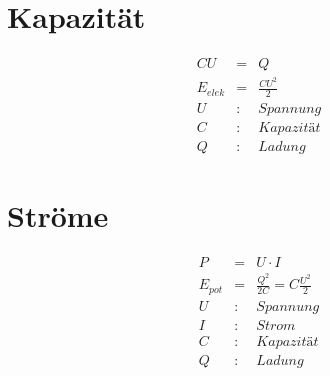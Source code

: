 \documentclass[11pt]{article}
\begin{document}
\section{Kapazität}
\begin{eqnarray*}
CU &=& Q\\
E_{elek} &=& \frac{CU^2}{2}\\
U &:& \textit{Spannung}\\
C &:& \textit{Kapazität}\\
Q &:& \textit{Ladung}
\end{eqnarray*}


\section{Ströme}
\begin{eqnarray*}
P &=& U\cdot I\\
E_{pot} &=& \frac{Q^2}{2C} = C \frac{U^2}{2}\\
U &:& \textit{Spannung}\\
I &:& \textit{Strom}\\
C &:& \textit{Kapazität}\\
Q &:& \textit{Ladung}
\end{eqnarray*}
\end{document}
